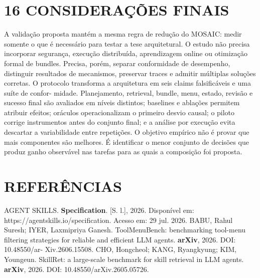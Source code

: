 \documentclass[12pt,a4paper]{article}
\begin{document}
\section*{16 CONSIDERAÇÕES FINAIS}

A validação proposta mantém a mesma regra de redução do MOSAIC: medir somente o que é necessário para testar a tese arquitetural. O estudo não precisa incorporar segurança, execução distribuída, aprendizagem online ou otimização formal de bundles. Precisa, porém, separar conformidade de desempenho, distinguir resultados de mecanismos, preservar traces e admitir múltiplas soluções corretas. O protocolo transforma a arquitetura em seis claims falsificáveis e uma suíte de confor- midade. Planejamento, retrieval, bundle, menu, estado, revisão e sucesso final são avaliados em níveis distintos; baselines e ablações permitem atribuir efeitos; oráculos operacionalizam o primeiro desvio causal; o piloto corrige instrumentos antes do conjunto final; e a análise por execução evita descartar a variabilidade entre repetições. O objetivo empírico não é provar que mais componentes são melhores. É identificar o menor conjunto de decisões que produz ganho observável nas tarefas para as quais a composição foi proposta.


\section*{REFERÊNCIAS}

AGENT SKILLS.\textbf{ Specification}. [S. l.], 2026. Disponível em: https://agentskills.io/specification. Acesso em: 29 jul. 2026. BABU, Rahul Suresh; IYER, Laxmipriya Ganesh. ToolMenuBench: benchmarking tool-menu filtering strategies for reliable and efficient LLM agents.\textbf{ arXiv}, 2026. DOI: 10.48550/ar- Xiv.2606.15508. CHO, Hongcheol; KANG, Ryangkyung; KIM, Youngeun. SkillRet: a large-scale benchmark for skill retrieval in LLM agents.\textbf{ arXiv}, 2026. DOI: 10.48550/arXiv.2605.05726.


\end{document}
